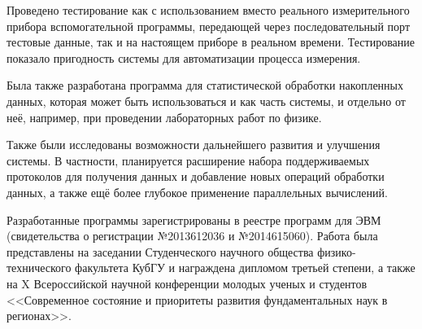 \documentclass[a4paper, 14pt, titlepage]{extarticle}
\newcounter{firstpage}
\newcommand\lastPageHere{\setcounter{pagenum}{\value{page} - \value{firstpage}}}
\begin{document}
  Проведено тестирование как с использованием вместо реального измерительного прибора вспомогательной
  программы, передающей через последовательный порт тестовые данные, так и на настоящем приборе в
  реальном времени. Тестирование показало пригодность системы для автоматизации процесса измерения.

  Была также разработана программа для статистической обработки накопленных
  данных, которая может быть использоваться и как часть системы, и отдельно от неё, например, при
  проведении лабораторных работ по физике.

  Также были исследованы возможности дальнейшего развития и улучшения системы. В частности,
  планируется расширение набора поддерживаемых протоколов для получения данных и добавление новых
  операций обработки данных, а также ещё более глубокое применение параллельных вычислений.

  Разработанные программы зарегистрированы в реестре программ для ЭВМ (свидетельства о регистрации
  №2013612036 и №2014615060). Работа была представлены на
  заседании Студенческого научного общества физико-технического факультета КубГУ и награждена
  дипломом третьей степени, а также на X Всероссийской научной конференции молодых ученых и
  студентов <<Современное состояние и приоритеты развития фундаментальных наук в регионах>>.

  \lastPageHere


  \begin{flushleft}
    
  \end{flushleft}
\end{document}

